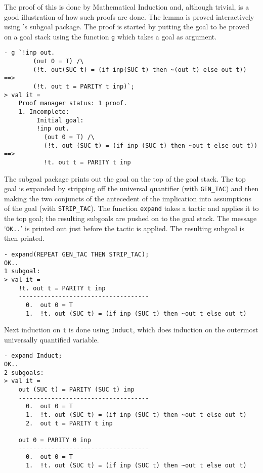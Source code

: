 \noindent The proof of this is done by Mathematical Induction and, although
trivial, is a good illustration of how such proofs are done.  The
lemma is proved interactively using \HOL's subgoal package.  The proof
is started by putting the goal to be proved on a goal stack using the
function {\small\verb|g|} which takes a goal as argument.

\begin{session}
\begin{verbatim}
- g `!inp out.
        (out 0 = T) /\
        (!t. out(SUC t) = (if inp(SUC t) then ~(out t) else out t)) ==>
        (!t. out t = PARITY t inp)`;
> val it =
    Proof manager status: 1 proof.
    1. Incomplete:
         Initial goal:
         !inp out.
           (out 0 = T) /\
           (!t. out (SUC t) = (if inp (SUC t) then ~out t else out t)) ==>
           !t. out t = PARITY t inp
\end{verbatim}
\end{session}

\noindent The subgoal package prints out the goal on the top of the goal stack.
The top goal is expanded by stripping off the universal quantifier
(with {\small\verb|GEN_TAC|}) and then making the two conjuncts of the
antecedent of the implication into assumptions of the goal (with
{\small\verb|STRIP_TAC|}).  The \ML{} function {\small\verb|expand|}
takes a tactic and applies it to the top goal; the resulting subgoals
are pushed on to the goal stack.  The message `{\small\verb|OK..|}' is
printed out just before the tactic is applied.  The resulting subgoal
is then printed.


\begin{session}
\begin{verbatim}
- expand(REPEAT GEN_TAC THEN STRIP_TAC);
OK..
1 subgoal:
> val it =
    !t. out t = PARITY t inp
    ------------------------------------
      0.  out 0 = T
      1.  !t. out (SUC t) = (if inp (SUC t) then ~out t else out t)
\end{verbatim}
\end{session}

\noindent Next induction on {\small\verb|t|} is done
using {\small\verb|Induct|}, which does
induction on the outermost universally quantified variable.

\begin{session}
\begin{verbatim}
- expand Induct;
OK..
2 subgoals:
> val it =
    out (SUC t) = PARITY (SUC t) inp
    ------------------------------------
      0.  out 0 = T
      1.  !t. out (SUC t) = (if inp (SUC t) then ~out t else out t)
      2.  out t = PARITY t inp

    out 0 = PARITY 0 inp
    ------------------------------------
      0.  out 0 = T
      1.  !t. out (SUC t) = (if inp (SUC t) then ~out t else out t)
\end{verbatim}
\end{session}

